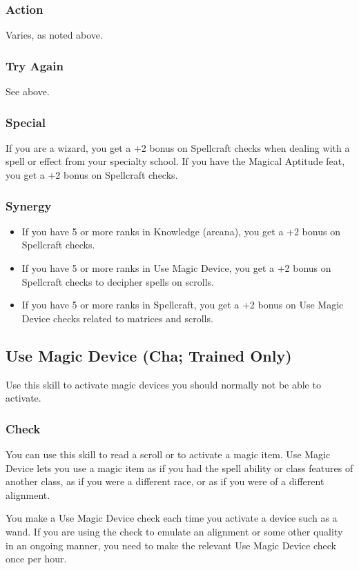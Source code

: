 \subsubsection{Action}
Varies, as noted above.
\subsubsection{Try Again}
See above.
\subsubsection{Special}
If you are a wizard, you get a +2 bonus on Spellcraft checks when dealing with a spell or effect from your specialty school. 
If you have the Magical Aptitude feat, you get a +2 bonus on Spellcraft checks.
\subsubsection{Synergy}
\begin{itemize}
 \item If you have 5 or more ranks in Knowledge (arcana), you get a +2 bonus on Spellcraft checks.
 \item If you have 5 or more ranks in Use Magic Device, you get a +2 bonus on Spellcraft checks to decipher spells on scrolls.
 \item If you have 5 or more ranks in Spellcraft, you get a +2 bonus on Use Magic Device checks related to matrices and scrolls.
\end{itemize}

\subsection[Use Magic Device]{Use Magic Device (Cha; Trained Only)}
\label{sec:UseMagicDevice}
Use this skill to activate magic devices you should normally not be able to activate.
\subsubsection{Check}
You can use this skill to read a scroll or to activate a magic item. Use Magic Device lets you use a magic item as if you had the spell ability or class features of another class, as if you were a different race, or as if you were of a different alignment.

You make a Use Magic Device check each time you activate a device such as a wand. If you are using the check to emulate an alignment or some other quality in an ongoing manner, you need to make the relevant Use Magic Device check once per hour.

